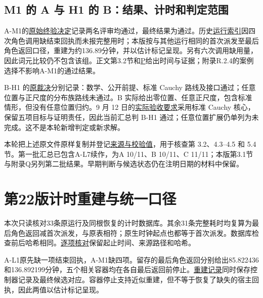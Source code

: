 \subsection[M1 的 A 与 H1 的 B：结果、计时和判定范围]{\texorpdfstring{\protect\hypertarget{o5}{}M1 的 A 与 H1 的 B：结果、计时和判定范围}{M1 的 A 与 H1 的 B：结果、计时和判定范围}}
A-M1的\href{verification/revision18/a-m1-decision.json}{原始终验决定}记录两名评审均通过，最终结果为通过。历史\href{manuscript/evidence/r9_rewrite_evidence/RUN_INDEX.csv}{运行索引}因四次角色调用缺结束回执而未报完整用时；本版按与其他运行相同的首次派发至最后角色返回口径，重建为约136.89分钟，并以估计标记呈现。另有六次调用缺用量，因此词元比较仍不包含该组。正文第3.2节和\hyperlink{appendix-p}{P}给出时间与证据；附录R.2.4的案例选择不影响A-M1的通过结果。

B-H1 的\href{verification/revision18/b-h1-assessment.json}{原裁决}分别记录：数学、公开前提、标准 Cauchy 路线及接口通过；任意位置与正尺度的分布族路线未通过。B 实际给出零位置、任意正尺度，包含标准情形，但没有任意位置归约。9 月 12 日的\href{verification/revision18/current-acceptance.zh-CN.md}{实际验收要求}采用标准 Cauchy 核心，保留五项目标与证明责任，因此当前汇总判 B-H1 通过；任意位置扩展仍单列为未完成。这不是本轮新增判定或新求解。

本轮把上述原文件原样复制并登记\href{verification/revision18/SOURCE_INDEX.json}{来源与校验值}，用于核查第 3.2、4.3–4.5 和 5.4 节。第一批汇总已包含A-L7续作，为A 10/11、B 10/11、C 11/11；本版第3.1节与附录Q另列第二批结果。早期判断与候选状态仍在注明日期的材料中保留。

\section[第22版计时重建与统一口径]{\texorpdfstring{\protect\hypertarget{appendix-p}{}第22版计时重建与统一口径}{第22版计时重建与统一口径}}
本次只读核对33条原运行及同根恢复的计时数据库。其余31条完整耗时均复算为最后角色返回减首次派发，与原表相符；原生时钟起点也都等于首次派发。数据库检查前后哈希相同。\href{verification/revision22/comparability_008.json}{逐项核对}保留起止时间、来源路径和哈希。

A-L1原先缺一项结束回执，A-M1缺四项。留存的最后角色返回分别给出85.822436和136.892199分钟，五个相关容器均在各自最后返回前停止。\href{verification/revision22/reconstruction.json}{重建记录}同时保存控制器记录及最终候选对应。容器停止支持近似重建，但不等于恢复了缺失的宿主回执，因此两值以估计标记呈现。

